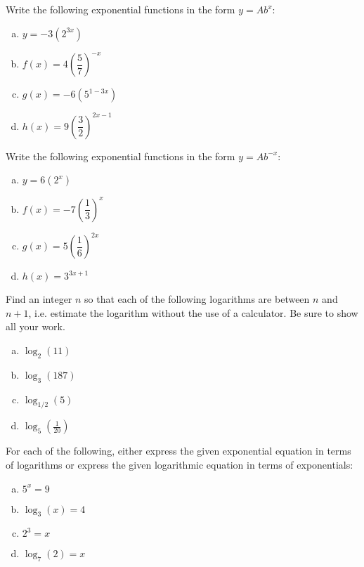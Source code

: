 \documentclass[11pt,letterpaper]{article}
\begin{document}

 Write the following exponential functions in the form $y= Ab^x$:
	\begin{enumerate}[(a)]
	\item $y= -3(2^{3x})$
	\item $f(x)= 4 \left( \dfrac{5}{7} \right)^{-x}$
	\item $g(x)= -6 (5^{1 - 3x})$
	\item $h(x)= 9 \left( \dfrac{3}{2} \right)^{2x - 1}$
	\end{enumerate}



\newpage



 Write the following exponential functions in the form $y= Ab^{-x}$:
	\begin{enumerate}[(a)]
	\item $y= 6 (2^x)$
	\item $f(x)= -7 \left( \dfrac{1}{3} \right)^x$
	\item $g(x)= 5 \left( \dfrac{1}{6} \right)^{2x}$
	\item $h(x)= 3^{3x + 1}$
	\end{enumerate}



\newpage



 Find an integer $n$ so that each of the following logarithms are between $n$ and $n + 1$, i.e. estimate the logarithm without the use of a calculator. Be sure to show all your work.
	\begin{enumerate}[(a)]
	\item $\log_2(11)$
	\item $\log_3(187)$
	\item $\log_{1/2}(5)$
	\item $\log_5(\frac{1}{20})$
	\end{enumerate}



\newpage



 For each of the following, either express the given exponential equation in terms of logarithms or express the given logarithmic equation in terms of exponentials:
	\begin{enumerate}[(a)]
	\item $5^x= 9$
	\item $\log_3(x)= 4$
	\item $2^3= x$
	\item $\log_7(2)= x$
	\end{enumerate}
\end{document}
